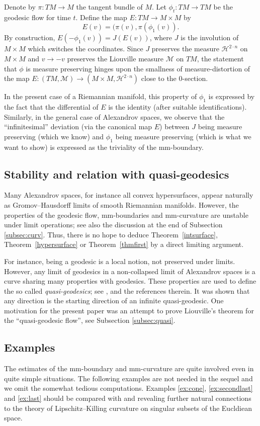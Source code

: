 \documentclass[12pt,leqno,intlimits]{amsart}
\numberwithin{equation}{section}
\theoremstyle{definition}
\theoremstyle{remark}
\newcommand{\tref}[1]{Theorem~\ref{#1}}
\def\:{\colon}
\begin{document}
Denote by $\pi\: TM\to M$ the tangent bundle of $M$.
Let $\phi_t\: TM\to TM$ be the geodesic flow for time $t$.
Define the map $E\:TM\to M\times M$ by
\[E(v)=(\pi(v), \pi (\phi _1 (v)).\]
By construction, $E(-\phi_1(v))= J(E(v))$,
where $J$ is the involution of $M\times M$ which switches the coordinates.
Since $J$ preserves the measure $\mathcal H^{2\cdot n}$ on $M\times M$ and $v\to -v$ preserves the Liouville measure $\mathcal M$ on $TM$,
the statement that $\phi$ is measure preserving hinges upon the smallness of measure-distortion of the map $E \:(TM,\mathcal M) \to (M\times M, \mathcal H^{2\cdot n})$ close to the $0$-section.

In the present case of a Riemannian manifold,
this property of $\phi_1$ is expressed by the fact that the differential of $E$ is the identity (after suitable identifications).
Similarly,
in the general case of Alexandrov spaces, we observe that the ``infinitesimal'' deviation (via the canonical map $E$) between $J$ being measure preserving (which we know) and $\phi _1$ being measure preserving (which is what we want to show)
is expressed as the triviality of the mm-boundary.

\subsection{Stability and relation with quasi-geodesics}
Many Alexandrov spaces, for instance all convex hypersurfaces, appear naturally as Gromov--Hausdorff limits of smooth Riemannian manifolds. However, the properties of the geodesic flow, mm-boundaries and mm-curvature are unstable under limit operations; see also the discussion at the end of Subsection \ref{subsec:curv}.
Thus, there is no hope to deduce \tref{intsurface}, \tref{hypersurface} or \tref{thmfirst} by a direct limiting argument.

For instance, being a geodesic is a local notion, not preserved under limits.
However, any limit of geodesics in a non-collapsed limit of Alexandrov spaces is a curve sharing many properties with geodesics.
These properties are used to define the so called \emph{quasi-geodesics}; see \cite{PP}, \cite{Petsemi} and the references therein. 
It was shown that any direction is the starting direction of an infinite quasi-geodesic.
One motivation for the present paper was an attempt to prove Liouville's theorem for the ``quasi-geodesic flow'', see Subsection \ref{subsec:quasi}.

\subsection{Examples} \label{subsec:example}
The estimates of the mm-boundary and mm-curvature are quite involved even in quite simple situations.
The following examples are not needed in the sequel and we omit the somewhat tedious computations. Examples \ref{ex:cone}, \ref{ex:secondlast} and \ref{ex:last} should be compared with
\cite{Bernig-CAT} and \cite{Bernig-Alex} revealing further natural connections to the theory of Lipschitz--Killing curvature on singular subsets of the Eucldiean space.
\end{document}
